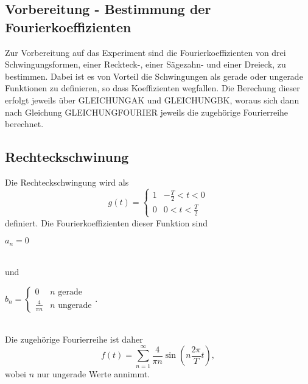 \subsection{Vorbereitung - Bestimmung der Fourierkoeffizienten}
\label{sec:vorbereitung}
Zur Vorbereitung auf das Experiment sind die Fourierkoeffizienten von drei Schwingungsformen, einer Reckteck-, einer Sägezahn-
und einer Dreieck, zu bestimmen. Dabei ist es von Vorteil die Schwingungen als gerade oder ungerade Funktionen zu definieren, so 
dass Koeffizienten wegfallen. Die Berechung dieser erfolgt jeweils über GLEICHUNGAK und GLEICHUNGBK, woraus sich dann nach Gleichung
GLEICHUNGFOURIER jeweils die zugehörige Fourierreihe berechnet.
    \subsection{Rechteckschwinung}
    Die Rechteckschwingung wird als
    \begin{equation}
    \label{eqn:rechteck}
    g(t) = \begin{cases}
                1 & -\frac{T}{2} < t < 0 \\
                0 & 0 < t < \frac{T}{2} 
            \end{cases}
    \end{equation}        
    definiert. Die Fourierkoeffizienten dieser Funktion sind
    \\
    \centerline{$a_n = 0$} 
    \\
    und
    \\ 
    \centerline{$b_n = \begin{cases}
                            0 & n \text{ gerade} \\
                            \frac{4}{\pi n } & n \text{ ungerade}
                        \end{cases}$.}
                        \\
    Die zugehörige Fourierreihe ist daher
    \begin{equation}
    \label{eqn:fourierrechteck}
    f(t) = \sum_{n=1}^{\infty}  \frac{4}{\pi n } \sin(n \frac{2 \pi}{T} t),
    \end{equation}
    wobei $n$ nur ungerade Werte annimmt.

